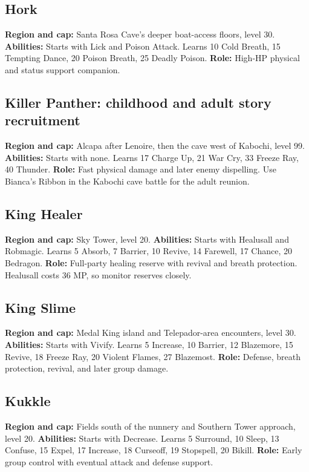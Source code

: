 \subsection{Hork}
\textbf{Region and cap:} Santa Rosa Cave's deeper boat-access floors, level 30.
\textbf{Abilities:} Starts with Lick and Poison Attack. Learns 10 Cold Breath,
15 Tempting Dance, 20 Poison Breath, 25 Deadly Poison.
\textbf{Role:} High-HP physical and status support companion.

\subsection{Killer Panther: childhood and adult story recruitment}
\textbf{Region and cap:} Alcapa after Lenoire, then the cave west of Kabochi, level 99.
\textbf{Abilities:} Starts with none. Learns 17 Charge Up, 21 War Cry,
33 Freeze Ray, 40 Thunder.
\textbf{Role:} Fast physical damage and later enemy dispelling. Use Bianca's
Ribbon in the Kabochi cave battle for the adult reunion.

\subsection{King Healer}
\textbf{Region and cap:} Sky Tower, level 20.
\textbf{Abilities:} Starts with Healusall and Robmagic. Learns 5 Absorb,
7 Barrier, 10 Revive, 14 Farewell, 17 Chance, 20 Bedragon.
\textbf{Role:} Full-party healing reserve with revival and breath protection.
Healusall costs 36 MP, so monitor reserves closely.

\subsection{King Slime}
\textbf{Region and cap:} Medal King island and Telepador-area encounters, level 30.
\textbf{Abilities:} Starts with Vivify. Learns 5 Increase, 10 Barrier,
12 Blazemore, 15 Revive, 18 Freeze Ray, 20 Violent Flames, 27 Blazemost.
\textbf{Role:} Defense, breath protection, revival, and later group damage.

\subsection{Kukkle}
\textbf{Region and cap:} Fields south of the nunnery and Southern Tower approach, level 20.
\textbf{Abilities:} Starts with Decrease. Learns 5 Surround, 10 Sleep,
13 Confuse, 15 Expel, 17 Increase, 18 Curseoff, 19 Stopspell, 20 Bikill.
\textbf{Role:} Early group control with eventual attack and defense support.


